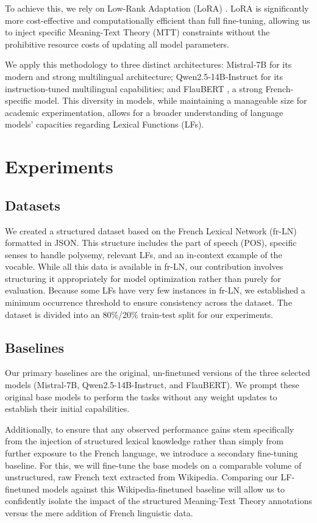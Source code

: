 \documentclass[11pt]{article}
\begin{document}
To achieve this, we rely on Low-Rank Adaptation (LoRA) \citep{LoRA}. LoRA is significantly more cost-effective and computationally efficient than full fine-tuning, allowing us to inject specific Meaning-Text Theory (MTT) constraints without the prohibitive resource costs of updating all model parameters.

We apply this methodology to three distinct architectures: Mistral-7B \citep{jiangMistral7B2023} for its modern and strong multilingual architecture; Qwen2.5-14B-Instruct \citep{qwen2} for its instruction-tuned multilingual capabilities; and FlauBERT \citep{leFlauBERTUnsupervisedLanguage2020}, a strong French-specific model. This diversity in models, while maintaining a manageable size for academic experimentation, allows for a broader understanding of language models' capacities regarding Lexical Functions (LFs).

\section{Experiments}
\subsection{Datasets}
We created a structured dataset based on the French Lexical Network (fr-LN) \citep{11403/lexical-system-fr/v3.2} formatted in JSON. This structure includes the part of speech (POS), specific senses to handle polysemy, relevant LFs, and an in-context example of the vocable. While all this data is available in fr-LN, our contribution involves structuring it appropriately for model optimization rather than purely for evaluation. Because some LFs have very few instances in fr-LN, we established a minimum occurrence threshold to ensure consistency across the dataset. The dataset is divided into an 80\%/20\% train-test split for our experiments.

\subsection{Baselines}
Our primary baselines are the original, un-finetuned versions of the three selected models (Mistral-7B, Qwen2.5-14B-Instruct, and FlauBERT). We prompt these original base models to perform the tasks without any weight updates to establish their initial capabilities. 

Additionally, to ensure that any observed performance gains stem specifically from the injection of structured lexical knowledge rather than simply from further exposure to the French language, we introduce a secondary fine-tuning baseline. For this, we will fine-tune the base models on a comparable volume of unstructured, raw French text extracted from Wikipedia. Comparing our LF-finetuned models against this Wikipedia-finetuned baseline will allow us to confidently isolate the impact of the structured Meaning-Text Theory annotations versus the mere addition of French linguistic data.
\end{document}
